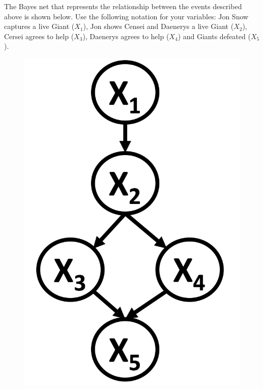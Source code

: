 \documentclass[11pt,addpoints,answers]{exam}
\begin{document}
The Bayes net that represents the relationship between the events described above is shown below. Use the following notation for your variables: Jon Snow captures a live Giant ($X_1$), Jon shows Censei and Daenerys a live Giant  ($X_2$), Cersei agrees to help ($X_3$), Daenerys agrees to help ($X_4$) and Giants defeated ($X_5$).
\begin{figure}[!hbtp]
\centering
\includegraphics[scale=0.3]{images/q2.png}
\end{figure}
\end{document}
